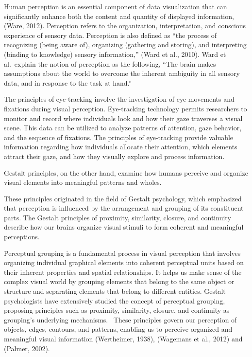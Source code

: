 \documentclass[print]{nuthesis}
\begin{document}
Human perception is an essential component of data visualization that can significantly enhance both the content and quantity of displayed information, (Ware, 2012).
Perception refers to the organization, interpretation, and conscious experience of sensory data.
Perception is also defined as ``the process of recognizing (being aware of), organizing (gathering and storing), and interpreting (binding to knowledge) sensory information,'' (Ward et al., 2010).
Ward et al.~explain the notion of perception as the following, ``The brain makes assumptions about the world to overcome the inherent ambiguity in all sensory data, and in response to the task at hand.''

The principles of eye-tracking involve the investigation of eye movements and fixations during visual perception.
Eye-tracking technology permits researchers to monitor and record where individuals look and how their gaze traverses a visual scene.
This data can be utilized to analyze patterns of attention, gaze behavior, and the sequence of fixations.
The principles of eye-tracking provide valuable information regarding how individuals allocate their attention, which elements attract their gaze, and how they visually explore and process information.

Gestalt principles, on the other hand, examine how humans perceive and organize visual elements into meaningful patterns and wholes.

These principles originated in the field of Gestalt psychology, which emphasized that perception is influenced by the arrangement and grouping of its constituent parts.
The Gestalt principles of proximity, similarity, closure, and continuity describe how our brains organize visual stimuli to form coherent and meaningful perceptions.

Perceptual grouping is a fundamental process in visual perception that involves organizing individual graphical elements into coherent perceptual units based on their inherent properties and spatial relationships.
It helps us make sense of the complex visual world by grouping elements that belong to the same object or structure and separating elements that belong to different entities. Gestalt psychologists have extensively studied the concept of perceptual grouping, proposing principles such as proximity, similarity, closure, and continuity as grouping's underlying mechanisms.~
These principles govern our perception of objects, edges, contours, and patterns, enabling us to perceive organized and meaningful visual information (Wertheimer, 1938), (Wagemans et al., 2012) and (Palmer, 2002).
\end{document}
